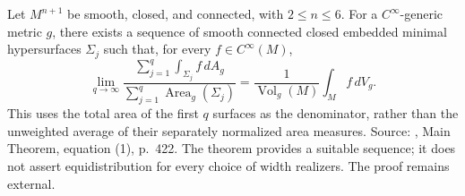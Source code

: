 \begin{theorem}\label{thm:generic-equidistribution}
Let $M^{n+1}$ be smooth, closed, and connected, with $2\leq n\leq6$. For a $C^\infty$-generic metric $g$, there exists a sequence of smooth connected closed embedded minimal hypersurfaces $\Sigma_j$ such that, for every $f\in C^\infty(M)$,
\[
 \lim_{q\to\infty}
 \frac{\sum_{j=1}^q\int_{\Sigma_j}f\,dA_g}
      {\sum_{j=1}^q\operatorname{Area}_g(\Sigma_j)}
 =\frac{1}{\operatorname{Vol}_g(M)}\int_M f\,dV_g.
\]
This uses the total area of the first $q$ surfaces as the denominator, rather than the unweighted average of their separately normalized area measures. Source: \cite{MNS19}, Main Theorem, equation (1), p.~422. The theorem provides a suitable sequence; it does not assert equidistribution for every choice of width realizers. The proof remains external.
\end{theorem}
